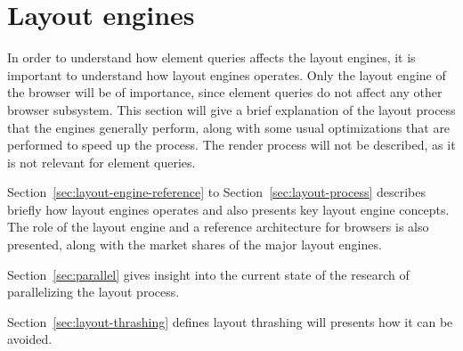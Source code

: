 \documentclass[a4paper,11pt]{kth-mag}
\begin{document}
    \section{Layout engines}\label{sec:layout-engines}
      In order to understand how element queries affects the \glspl{layout engine}, it is important to understand how \glspl{layout engine} operates.
      Only the \gls{layout engine} of the \gls{browser} will be of importance, since element queries do not affect any other \gls{browser} subsystem.
      This section will give a brief explanation of the layout process that the engines generally perform, along with some usual optimizations that are performed to speed up the process.
      The render process will not be described, as it is not relevant for element queries.

      Section~\ref{sec:layout-engine-reference} to Section~\ref{sec:layout-process} describes briefly how layout engines operates and also presents key layout engine concepts.
      The role of the layout engine and a reference architecture for browsers is also presented, along with the market shares of the major layout engines.

      Section~\ref{sec:parallel} gives insight into the current state of the research of parallelizing the layout process.
      
      Section~\ref{sec:layout-thrashing} defines layout thrashing will presents how it can be avoided.
      
\end{document}
